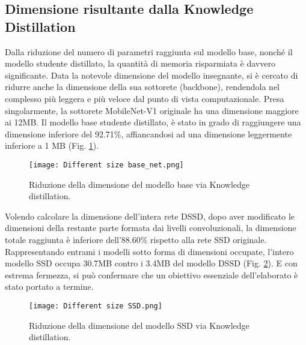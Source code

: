 \subsection{Dimensione risultante dalla Knowledge Distillation}
Dalla riduzione del numero di parametri raggiunta sul modello base, nonché il modello studente distillato, la quantità di memoria risparmiata è davvero significante. Data la notevole dimensione del modello insegnante, si è cercato di ridurre anche la dimensione della sua sottorete  (backbone), rendendola nel complesso più leggera e più veloce dal punto di vista computazionale. Presa singolarmente, la sottorete MobileNet-V1 originale ha una dimensione maggiore ai 12MB. Il modello base studente distillato, è stato in grado di raggiungere una dimensione inferiore del 92.71\%, affiancandosi ad una dimensione leggermente inferiore a 1 MB (Fig. \ref{base_dim}).
\begin{figure}
    \centering
    \texttt{[image: Different size base\_net.png]}
    \centering
    \caption{Riduzione della dimensione del modello base via Knowledge distillation.}
    \label{base_dim}
\end{figure}
Volendo calcolare la dimensione dell'intera rete DSSD, dopo aver modificato le dimensioni della restante parte formata dai livelli convoluzionali, la dimensione totale raggiunta è inferiore dell'88.60\% rispetto alla rete SSD originale. Rappresentando entrami i modelli sotto forma di dimensioni occupate, l'intero modello SSD occupa 30.7MB contro i 3.4MB del modello DSSD (Fig. \ref{SSD_dim_KD}). E con estrema fermezza, si può confermare che un obiettivo essenziale dell'elaborato è stato portato a termine.
\begin{figure}
    \centering
    \texttt{[image: Different size SSD.png]}
    \centering
    \caption{Riduzione della dimensione del modello SSD via Knowledge distillation.}
    \label{SSD_dim_KD}
\end{figure}

